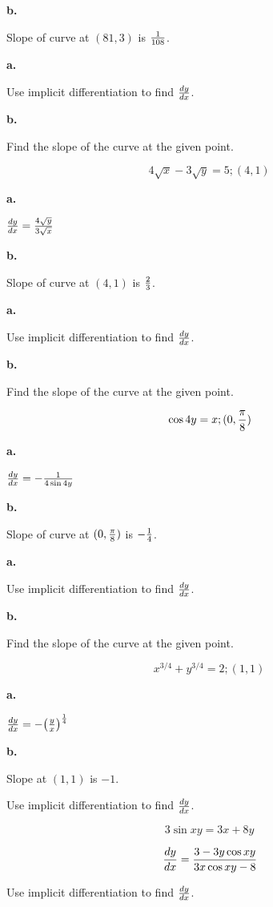 {\par \bf b.} Slope of curve at $(81, 3)$ is ${1 \over 108}$.
\bigskip

{\par \bf a.} Use implicit differentiation to find ${dy \over dx}$.

{\par \bf b.} Find the slope of the curve at the given point.

$$\
4\sqrt{x} - 3\sqrt{y} = 5; (4, 1)
$$

{\par \bf a.} ${dy \over dx} = {4 \sqrt{y} \over 3 \sqrt{x}}$

{\par \bf b.} Slope of curve at $(4, 1)$ is ${2 \over 3}$.
\bigskip


{\par \bf a.} Use implicit differentiation to find ${dy \over dx}$.

{\par \bf b.} Find the slope of the curve at the given point.

$$\
\cos 4 y = x; (0, {\pi \over 8})
$$

{\par \bf a.} ${dy \over dx} = -{1 \over 4 \sin 4y}$

{\par \bf b.} Slope of curve at $(0, {\pi \over 8})$ is $-{1 \over 4}$.
\bigskip

{\par \bf a.} Use implicit differentiation to find ${dy \over dx}$.

{\par \bf b.} Find the slope of the curve at the given point.

$$\
x^{3/4} + y^{3/4} = 2; (1, 1)
$$

{\par \bf a.} ${dy \over dx} = -\big({y \over x}\big)^{1 \over 4}$

{\par \bf b.} Slope at $(1, 1)$ is $-1$.
\bigskip

Use implicit differentiation to find ${dy \over dx}$.

$$\
3 \sin xy = 3x + 8y
$$

$$\
{dy \over dx} =
{
3 - 3y\cos xy
\over
3x\cos xy -8
}
$$

Use implicit differentiation to find ${dy \over dx}$.

